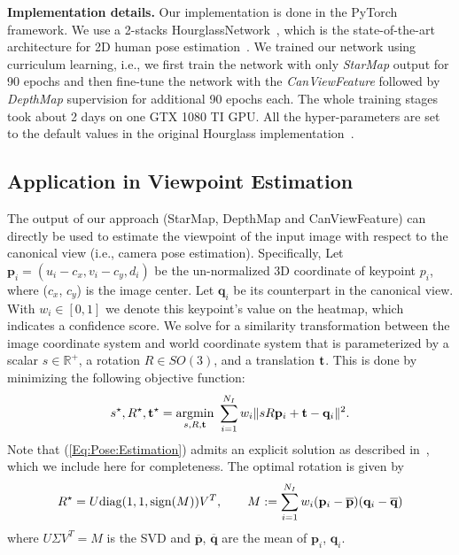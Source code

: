 \documentclass[runningheads]{llncs}
\begin{document}
\noindent\textbf{Implementation details.}
Our implementation is done in the PyTorch framework. 
We use a 2-stacks HourglassNetwork~\cite{newell2016stacked}, which is the state-of-the-art architecture for 2D human pose estimation~\cite{andriluka14cvpr}. 
We trained our network using curriculum learning, i.e., we first train the network with only \emph{StarMap} output for 90 epochs and then fine-tune the network with the \emph{CanViewFeature} followed by \emph{DepthMap} supervision for additional 90 epochs each. 
The whole training stages took about 2 days on one GTX 1080 TI GPU. 
All the hyper-parameters are set to the default values in the original Hourglass implementation~\cite{newell2016stacked}. 


\subsection{Application in Viewpoint Estimation}
\label{Section:Pose:Estimation}

The output of our approach (StarMap, DepthMap and CanViewFeature) can directly be used to estimate the viewpoint of the input image with respect to the canonical view (i.e., camera pose estimation). Specifically, Let ${\mathbf{p}}_i = (u_i-c_x, v_i-c_y,d_i)$ be the un-normalized 3D coordinate of keypoint $p_i$, where ($c_x$, $c_y$) is the image center. Let $\mathbf{q}_i$ be its counterpart in the canonical view. With $w_i\in [0,1]$ we denote this keypoint's value on the heatmap, which indicates a confidence score. We solve for a similarity transformation between the image coordinate system and world coordinate system that is parameterized by a scalar $s\in \mathbb{R}^{+}$, a rotation $R \in SO(3)$, and a translation $\mathbf{t}$. This is done by minimizing the following objective function:
\begin{equation}
s^{\star}, R^{\star}, \mathbf{t}^{\star} = \underset{s, R, \mathbf{t}}{\textup{argmin}}\ \sum\limits_{i=1}^{N_I} w_i\|sR{\mathbf{p}}_i + \mathbf{t}-\mathbf{q}_i\|^2.
\label{Eq:Pose:Estimation}
\end{equation}
Note that (\ref{Eq:Pose:Estimation}) admits an explicit solution as described in~\cite{horn1987closed}, which we include here for completeness. The optimal rotation is given by
\begin{equation}
R^{\star} = U\textup{diag}(1,1,\textup{sign}(M))V^{T},\qquad M:= \sum\limits_{i=1}^{N_I}w_i (\mathbf{p}_i-\overline{\mathbf{p}})(\mathbf{q}_i-\overline{\mathbf{q}})
\label{Eq:Pose:Solution}
\end{equation}
where $U\Sigma V^{T} = M$ is the SVD and $\overline{\mathbf{p}}$, $\overline{\mathbf{q}}$ are the mean of $\mathbf{p}_i$, $\mathbf{q}_i$. 
\end{document}
